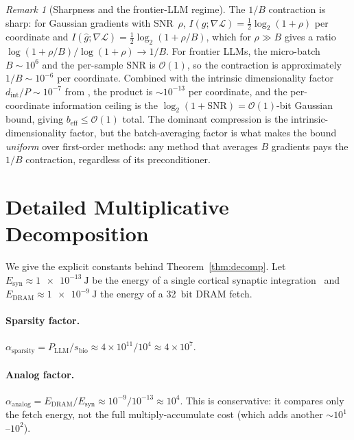 \documentclass[11pt]{article}
\providecommand{\joule}{\ensuremath{\mathrm{J}}}
\providecommand{\bit}{\ensuremath{\mathrm{bit}}}
\theoremstyle{definition}
\theoremstyle{remark}
\newtheorem{remark}[theorem]{Remark}
\begin{document}
\begin{remark}[Sharpness and the frontier-LLM regime]
The $1/B$ contraction is sharp: for Gaussian gradients with
SNR~$\rho$, $I(g;\nabla\mathcal{L})=\tfrac{1}{2}\log_{2}(1+\rho)$ per
coordinate and
$I(\hat{g};\nabla\mathcal{L})=\tfrac{1}{2}\log_{2}(1+\rho/B)$, which
for $\rho\gg B$ gives a ratio $\log(1+\rho/B)/\log(1+\rho)\to 1/B$.
For frontier LLMs, the micro-batch $B\sim 10^{6}$ and the per-sample
SNR is $\mathcal{O}(1)$, so the contraction is approximately
$1/B\sim 10^{-6}$ per coordinate.  Combined with the intrinsic
dimensionality factor $d_{\mathrm{int}}/P\sim 10^{-7}$ from
, the product is $\sim 10^{-13}$ per coordinate,
and the per-coordinate information ceiling is the
$\log_{2}(1+\mathrm{SNR})=\mathcal{O}(1)$-bit Gaussian bound, giving
$b_{\mathrm{eff}}\le\mathcal{O}(1)$ total.  The dominant compression
is the intrinsic-dimensionality factor, but the batch-averaging
factor is what makes the bound \emph{uniform} over first-order
methods: any method that averages $B$ gradients pays the $1/B$
contraction, regardless of its preconditioner.
\end{remark}

\section{Detailed Multiplicative Decomposition}
\label{app:decomp}

We give the explicit constants behind
Theorem~\ref{thm:decomp}.  Let $E_{\mathrm{syn}}\approx\SI{1e-13}{\joule}$
be the energy of a single cortical synaptic integration~\cite{attwell2001energy,lennie2003cost}
and $E_{\mathrm{DRAM}}\approx\SI{1e-9}{\joule}$ the energy of a
\SI{32}{\bit} DRAM fetch.

\paragraph{Sparsity factor.}
$\alpha_{\mathrm{sparsity}} = P_{\mathrm{LLM}}/s_{\mathrm{bio}}
\approx 4\times 10^{11}/10^{4} \approx 4\times 10^{7}$.

\paragraph{Analog factor.}
$\alpha_{\mathrm{analog}} = E_{\mathrm{DRAM}}/E_{\mathrm{syn}}
\approx 10^{-9}/10^{-13} \approx 10^{4}$.  This is conservative: it
compares only the fetch energy, not the full multiply-accumulate
cost (which adds another $\sim\!10^{1}$--$10^{2}$).
\end{document}
